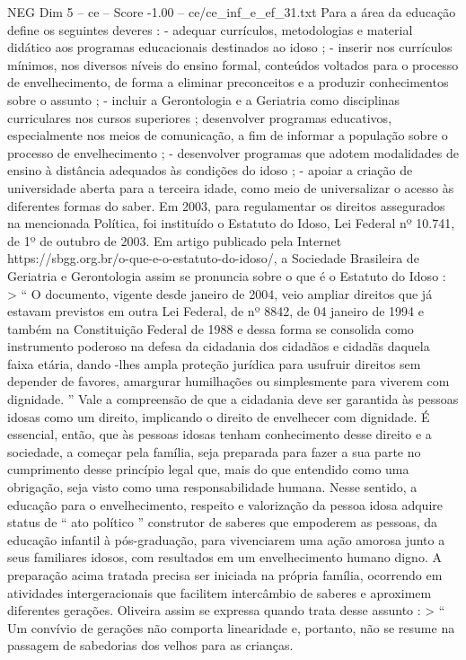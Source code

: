 \begin{textsample}{NEG Dim 5 – ce – Score -1.00 – ce/ce\_inf\_e\_ef\_31.txt}
Para a área da educação define os seguintes deveres : - adequar currículos, metodologias e material didático aos programas educacionais destinados ao idoso ; - inserir nos currículos mínimos, nos diversos níveis do ensino formal, conteúdos voltados para o processo de envelhecimento, de forma a eliminar preconceitos e a produzir conhecimentos sobre o assunto ; - incluir a Gerontologia e a Geriatria como disciplinas curriculares nos cursos superiores ; desenvolver programas educativos, especialmente nos meios de comunicação, a fim de informar a população sobre o processo de envelhecimento ; - desenvolver programas que adotem modalidades de ensino à distância adequados às condições do idoso ; - apoiar a criação de universidade aberta para a terceira idade, como meio de universalizar o acesso às diferentes formas do saber.
Em 2003, para regulamentar os direitos assegurados na mencionada Política, foi instituído o Estatuto do Idoso, Lei Federal nº 10.741, de 1º de outubro de 2003.
Em artigo publicado pela Internet https://sbgg.org.br/o-que-e-o-estatuto-do-idoso/, a Sociedade Brasileira de Geriatria e Gerontologia assim se pronuncia sobre o que é o Estatuto do Idoso : > “ O documento, vigente desde janeiro de 2004, veio ampliar direitos que já estavam previstos em outra Lei Federal, de nº 8842, de 04 janeiro de 1994 e também na Constituição Federal de 1988 e dessa forma se consolida como instrumento poderoso na defesa da cidadania dos cidadãos e cidadãs daquela faixa etária, dando -lhes ampla proteção jurídica para usufruir direitos sem depender de favores, amargurar humilhações ou simplesmente para viverem com dignidade. ” Vale a compreensão de que a cidadania deve ser garantida às pessoas idosas como um direito, implicando o direito de envelhecer com dignidade.
É essencial, então, que às pessoas idosas tenham conhecimento desse direito e a sociedade, a começar pela família, seja preparada para fazer a sua parte no cumprimento desse princípio legal que, mais do que entendido como uma obrigação, seja visto como uma responsabilidade humana.
Nesse sentido, a educação para o envelhecimento, respeito e valorização da pessoa idosa adquire status de “ ato político ” construtor de saberes que empoderem as pessoas, da educação infantil à pós-graduação, para vivenciarem uma ação amorosa junto a seus familiares idosos, com resultados em um envelhecimento humano digno.
A preparação acima tratada precisa ser iniciada na própria família, ocorrendo em atividades intergeracionais que facilitem intercâmbio de saberes e aproximem diferentes gerações.
Oliveira assim se expressa quando trata desse assunto : > “ Um convívio de gerações não comporta linearidade e, portanto, não se resume na passagem de sabedorias dos velhos para as crianças.

\end{textsample}

